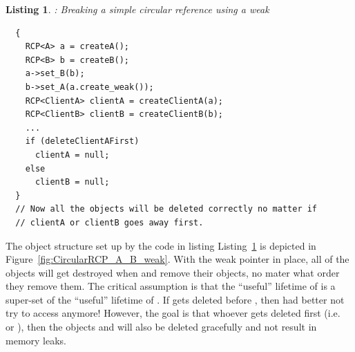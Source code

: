 \documentclass[pdf,ps2pdf,11pt]{SANDreport}
\newtheorem{listing}{Listing}
\begin{document}
\begin{listing}: Breaking a simple circular reference using a weak
{} \\
\label{listing:CircularRCP_A_B_weak}
{\small\begin{verbatim}
  {
    RCP<A> a = createA();
    RCP<B> b = createB();
    a->set_B(b);
    b->set_A(a.create_weak());
    RCP<ClientA> clientA = createClientA(a);
    RCP<ClientB> clientB = createClientB(b);
    ...
    if (deleteClientAFirst)
      clientA = null;
    else
      clientB = null;
  }
  // Now all the objects will be deleted correctly no matter if
  // clientA or clientB goes away first.
\end{verbatim}}
\end{listing}


The object structure set up by the code in listing
Listing~\ref{listing:CircularRCP_A_B_weak} is depicted in
Figure~\ref{fig:CircularRCP_A_B_weak}.  With the weak pointer in
place, all of the objects will get destroyed when {} and
{} remove their {} objects, no mater what order
they remove them.  The critical assumption is that the ``useful''
lifetime of {} is a super-set of the ``useful'' lifetime of
{}.  If {} gets deleted before {}, then {}
had better not try to access {} anymore!  However, the goal is
that whoever gets deleted first (i.e.\ {} or
{}), then the objects {} and {} will also
be deleted gracefully and not result in memory leaks.
\end{document}
